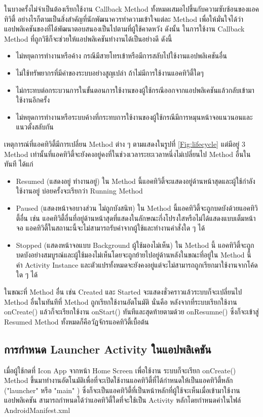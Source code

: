 	ในบางครั้งไม่จำเป็นต้องเรียกใช้งาน Callback Method ทั้งหมดเสมอไปขึ้นกับความซับซ้อนของแอคทิวิตี้ อย่างไรก็ตามเป็นสิ่งสำคัญที่นักพัฒนาควรทำความเข้าใจแต่ละ Method เพื่อให้มั่นใจได้ว่าแอปพลิเคชันของที่ได้พัฒนาตอบสนองเป็นไปตามที่ผู้ใช้คาดหวัง ดังนั้น ในการใช้งาน Callback Method
	ที่ถูกวิธีก็จะช่วยให้แอปพลิเคชันทำงานได้เป็นอย่างดี ดังนี้
	\begin{itemize}
		\item ไม่หยุดการทำงานหรือค้าง กรณีมีสายโทรเข้าหรือมีการสลับไปใช้งานแอปพลิเคชันอื่น 
		\item ไม่ใช้ทรัพยากรที่มีค่าของระบบอย่างสูญเปล่า ถ้าไม่มีการใช้งานแอคทิวิตี้ใดๆ 
		\item ไม่กระทบต่อกระบวนการในขั้นตอนการใช้งานของผู้ใช้กรณีออกจากแอปพลิเคชันแล้วกลับเข้ามาใช้งานอีกครั้ง 
		\item ไม่หยุดการทำงานหรือระบบค้างที่กระทบการใช้งานของผู้ใช้กรณีมีการหมุนหน้าจอแนวนอนและแนวตั้งสลับกัน
	\end{itemize}
	
	เหตุการณ์ที่แอคทิวิตี้มีการเปลี่ยน Method ต่าง ๆ ตามแสดงในรูปที่  \ref{Fig:lifecycle}
	แต่มีอยู่ 3 Method เท่านั้นที่แอคทิวิตี้จะยังคงอยู่คงที่ในช่วงเวลาระยะเวลาหนึ่งไม่เปลี่ยนไป Method อื่นในทันที ได้แก่
		\begin{itemize}
		\item Resumed (แสดงอยู่ ทำงานอยู่) ใน Method นี้แอคทิวิตี้จะแสดงอยู่ด้านหน้าสุดและผู้ใช้กำลังใช้งานอยู่ บ่อยครั้งจะเรียกว่า Running Method
		\item Paused (แสดงหน้าจอบางส่วน ไม่ถูกบังสนิท) ใน Method นี้แอคทิวิตี้จะถูกบดบังด้วยแอคทิวิตี้อื่น เช่น แอคทิวิตี้อื่นที่อยู่ด้านหน้าสุดที่แสดงในลักษณะกึ่งโปรงใสหรือไม่ได้แสดงแบบเต็มหน้าจอ  แอคทิวิตี้ในสถานะนี้จะไม่สามารถรับค่าจากผู้ใช้และทำงานคำสั่งใด ๆ ได้
		\item Stopped (แสดงหน้าจอแบบ Background ผู้ใช้มองไม่เห็น) ใน Method นี้ แอคทิวิตี้จะถูกบดบังอย่างสมบูรณ์และผู้ใช้มองไม่เห็นโดยจะถูกย้ายไปอยู่ด้านหลังในขณะที่อยู่ใน Method นี้
		ค่า Activity Instance และตัวแปรทั้งหมดจะยังคงอยู่แต่จะไม่สามารถถูกเรียกมาใช้งานจากโค้ดใด ๆ ได้
		\end{itemize}
		ในขณะที่ Method อื่น เช่น Created และ Started จะแสดงชั่วคราวแล้วระบบก็จะเปลี่ยนไป Method อื่นในทันทีที่ Method ถูกเรียกใช้งานอัตโนมัติ นั่นคือ หลังจากที่ระบบเรียกใช้งาน onCreate() แล้วก็จะเรียกใช้งาน onStart()
		ทันทีและสุดท้ายตามด้วย onResumne()  ซึ่งก็จะเข้าสู่ Resumed Method ทั้งหมดก็คือวัฏจักรแอคทิวิตี้เบื้อต้น
		
	\subsection{การกำหนด Launcher Activity ในแอปพลิเคชัน}
	เมื่อผู้ใช้กดที่ Icon App จากหน้า Home Screen เพื่อใช้งาน ระบบก็จะเรียก onCreate() Method
	ขึ้นมาทำงานอัตโนมัติเพื่อที่จะเปิดใช้งานแอคทิวิตี้ที่ได้กำหนดให้เป็นแอคทิวิตี้หลัก ("launcher" หรือ "main" ) 
	ซึ่งก็จะเป็นแอคทิวิตี้ที่เป็นหน้าหลักที่ผู้ใช้จะเห็นเมื่อเข้ามาใช้งานแอปพลิเคชัน สามารถกำหนดได้ว่าแอคทิวิตี้ใดที่จะใช้เป็น Activity หลักโดยกำหนดค่าในไฟล์ AndroidManifest.xml
	
